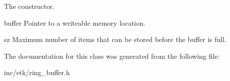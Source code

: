 The constructor. 

\begin{DoxyItemize}
\item buffer Pointer to a writeable memory location. \item sz Maximum number of items that can be stored before the buffer is full. \end{DoxyItemize}


The documentation for this class was generated from the following file\-:\begin{DoxyCompactItemize}
\item 
inc/etk/ring\-\_\-buffer.\-h\end{DoxyCompactItemize}
